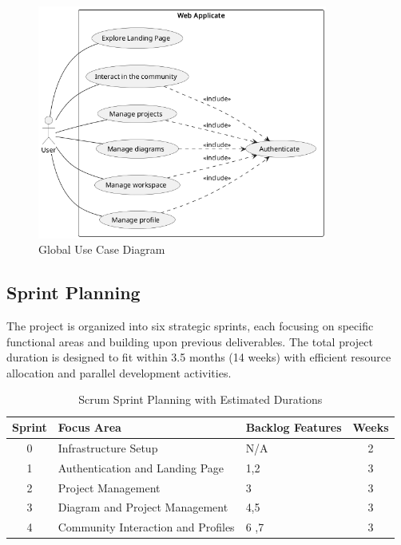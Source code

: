 \begin{figure}[H]
    \centering
    \includegraphics[width=0.85\textwidth]{./conception/global_use_case_diagram.png}
    \caption{Global Use Case Diagram}
    \label{fig:global_use_case}
\end{figure}

\subsection{Sprint Planning}

The project is organized into six strategic sprints, each focusing on specific functional areas and building upon previous deliverables. The total project duration is designed to fit within 3.5 months (14 weeks) with efficient resource allocation and parallel development activities.

\begin{table}[h!]
    \centering
    \begin{tabular}{|c|l|l|c|}
        \hline
        \textbf{Sprint} & \textbf{Focus Area}                                & \textbf{Backlog Features}                                   & \textbf{Weeks} \\ \hline
        0              & Infrastructure Setup                               & N/A                                                     & 2                                   \\ \hline
        1             & Authentication and Landing Page                    & 1,2                              & 3                                 \\ \hline
        2            & Project Management                                 & 3                            & 3                                   \\ \hline
        3             & Diagram and Project Management                     & 4,5                            & 3                                   \\ \hline
        4              & Community Interaction and Profiles                 & 6 ,7                          & 3                                   \\ \hline
    \end{tabular}
    \caption{Scrum Sprint Planning with Estimated Durations}
\end{table}

